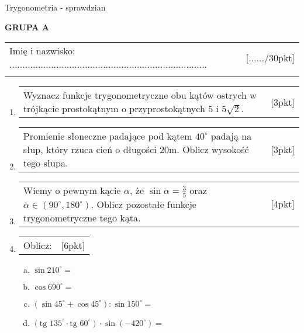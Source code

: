 \documentclass[12pt,a4paper]{article}
\begin{document}
	\begin{center}
		\LARGE Trygonometria - sprawdzian
	\end{center}
	\vspace{1.5cm}
	\begin{flushright}
		\textbf{GRUPA A}
	\end{flushright}
	\begin{tabular}{p{13cm} r}
		Imię i nazwisko: ............................................................................
		&[....../30pkt]\\ 
		\vspace{0.5cm}
	\end{tabular}
	\begin{enumerate}[1.]
		\item  \begin{tabular}{p{13cm} r}
			Wyznacz funkcje trygonometryczne obu kątów ostrych w trójkącie prostokątnym o przyprostokątnych $5$ i $5\sqrt{2}$. &[3pkt]\\ 
		\end{tabular}
		
		\item  \begin{tabular}{p{13cm} r}
			Promienie słoneczne padające pod kątem $40^\circ$ padają na słup, który rzuca cień o długości 20m. Oblicz wysokość tego słupa.
			&[3pkt]\\ 
		\end{tabular}
		
		\item \begin{tabular}{p{13cm} r}
			Wiemy o pewnym kącie $\alpha$, że $\sin \alpha = \frac{3}{5}$ oraz $\alpha\in (90^\circ,180^\circ)$. Oblicz pozostałe funkcje trygonometryczne tego kąta.
			&[4pkt]\\
		\end{tabular}
		
		\item \begin{tabular}{p{13cm} r}
			Oblicz: &[6pkt]\\ 
		\end{tabular}
		\begin{enumerate}[a)]
			\item $\sin210^\circ=$
			\item $\cos 690^\circ= $
			\item $(\sin 45^\circ + \cos 45^\circ) : \sin150^\circ= $
			\item $(\text{tg }135^\circ \cdot \text{tg } 60^\circ) \cdot \sin (-420^\circ)=$
		\end{enumerate}
	

\end{enumerate}
\end{document}
